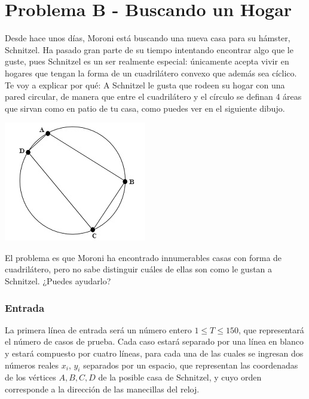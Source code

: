 \chapter*{Problema B - Buscando un Hogar}


Desde hace unos días, Moroni está buscando una nueva casa para su hámster, Schnitzel. Ha pasado gran parte de su tiempo intentando encontrar algo que le guste, pues Schnitzel es un ser realmente especial: únicamente acepta vivir en hogares que tengan la forma de un cuadrilátero convexo que además sea cíclico. Te voy a explicar por qué: A Schnitzel le gusta que rodeen su hogar con una pared circular, de manera que entre el cuadrilátero y el círculo se definan 4 áreas que sirvan como en patio de tu casa, como puedes ver en el siguiente dibujo.

\begin{center}
\includegraphics{CuadrilateroCiclico}
\end{center}

El problema es que Moroni ha encontrado innumerables casas con forma de
cuadrilátero, pero no sabe distinguir cuáles de ellas son como le gustan a 
Schnitzel. ¿Puedes ayudarlo?


\subsection*{Entrada}

La primera línea de entrada será un número entero $1 \leq T \leq 150$, que representará el número de casos de prueba. Cada caso estará separado por una línea en blanco y estará compuesto por cuatro líneas, para cada una de las cuales se ingresan dos números reales $x_i$, $y_i$ separados por un espacio, que representan las coordenadas de los vértices $A, B, C, D$ de la posible casa de Schnitzel, y cuyo orden corresponde a la dirección de las manecillas del reloj. 


